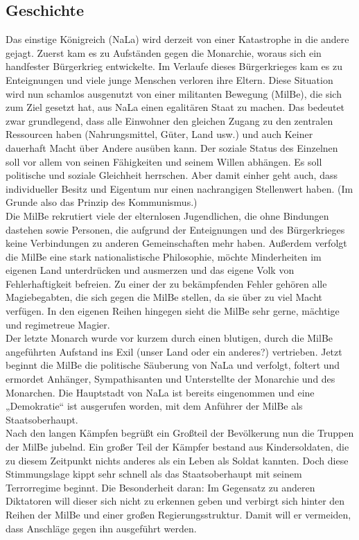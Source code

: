 \subsection{Geschichte}
Das einstige Königreich (NaLa) wird derzeit von einer Katastrophe in die andere gejagt. Zuerst kam es zu Aufständen gegen die Monarchie, woraus sich ein handfester Bürgerkrieg entwickelte. Im Verlaufe dieses Bürgerkrieges kam es zu Enteignungen und viele junge Menschen verloren ihre Eltern. Diese Situation wird nun schamlos ausgenutzt von einer militanten Bewegung (MilBe), die sich zum Ziel gesetzt hat, aus NaLa einen egalitären Staat zu machen. Das bedeutet zwar grundlegend, dass alle Einwohner den gleichen Zugang zu den zentralen Ressourcen haben (Nahrungsmittel, Güter, Land usw.) und auch Keiner dauerhaft Macht über Andere ausüben kann. Der soziale Status des Einzelnen soll vor allem von seinen Fähigkeiten und seinem Willen abhängen. Es soll politische und soziale Gleichheit herrschen. Aber damit einher geht auch, dass individueller Besitz und Eigentum nur einen nachrangigen Stellenwert haben. (Im Grunde also das Prinzip des Kommunismus.)\\
Die MilBe rekrutiert viele der elternlosen Jugendlichen, die ohne Bindungen dastehen sowie Personen, die aufgrund der Enteignungen und des Bürgerkrieges keine Verbindungen zu anderen Gemeinschaften mehr haben. Außerdem verfolgt die MilBe eine stark nationalistische Philosophie, möchte Minderheiten im eigenen Land unterdrücken und ausmerzen und das eigene Volk von Fehlerhaftigkeit befreien. Zu einer der zu bekämpfenden Fehler gehören alle Magiebegabten, die sich gegen die MilBe stellen, da sie über zu viel Macht verfügen. In den eigenen Reihen hingegen sieht die MilBe sehr gerne, mächtige und regimetreue Magier.\\
Der letzte Monarch wurde vor kurzem durch einen blutigen, durch die MilBe angeführten Aufstand ins Exil (unser Land oder ein anderes?) vertrieben. Jetzt beginnt die MilBe die politische Säuberung von NaLa und verfolgt, foltert und ermordet Anhänger, Sympathisanten und Unterstellte der Monarchie und des Monarchen. Die Hauptstadt von NaLa ist bereits eingenommen und eine „Demokratie“ ist ausgerufen worden, mit dem Anführer der MilBe als Staatsoberhaupt.\\
Nach den langen Kämpfen begrüßt ein Großteil der Bevölkerung nun die Truppen der MilBe jubelnd. Ein großer Teil der Kämpfer bestand aus Kindersoldaten, die zu diesem Zeitpunkt nichts anderes als ein Leben als Soldat kannten. Doch diese Stimmungslage kippt sehr schnell als das Staatsoberhaupt mit seinem Terrorregime beginnt. Die Besonderheit daran: Im Gegensatz zu anderen Diktatoren will dieser sich nicht zu erkennen geben und verbirgt sich hinter den Reihen der MilBe und einer großen Regierungsstruktur. Damit will er vermeiden, dass Anschläge gegen ihn ausgeführt werden.\\
